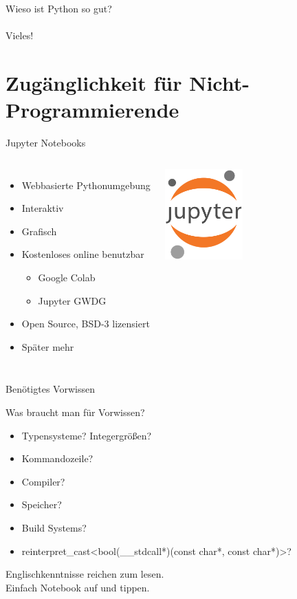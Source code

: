 \documentclass{beamer}
\begin{document}
\begin{frame}
\begin{center}
{ \Huge Wieso ist Python so gut?}\\~\\
\pause
Vieles!
\end{center}
\end{frame}

\section{Zug\"anglichkeit f\"ur Nicht-Programmierende}

\begin{frame}{Jupyter Notebooks}
\begin{columns}[onlytextwidth,T]
\column{\dimexpr\linewidth-30mm-5mm}
\begin{itemize}
\item Webbasierte Pythonumgebung
\item Interaktiv
\item Grafisch
\item Kostenloses online benutzbar
\begin{itemize}
\item Google Colab
\item Jupyter GWDG
\end{itemize}
\item Open Source, BSD-3 lizensiert
\item Sp\"ater mehr
\end{itemize}
\column{30mm}
\includegraphics[width=30mm]{./assets/jupyter.png}
\end{columns}
\end{frame}

\begin{frame}{Ben\"otigtes Vorwissen}
\begin{center}
\LARGE Was braucht man f\"ur Vorwissen?
\end{center}
\pause
\begin{itemize}
\item Typensysteme? Integergr\"o\ss{}en?
\pause
\item Kommandozeile?
\pause
\item Compiler?
\pause
\item Speicher?
\pause
\item Build Systems?
\pause
\item reinterpret\_cast\textless bool(\_\_stdcall*)(const char*, const char*)\textgreater?
\pause
\end{itemize}
\begin{center}
\Large Englischkenntnisse reichen zum lesen.\\
Einfach Notebook auf und tippen.
\end{center}
\end{frame}
\end{document}
